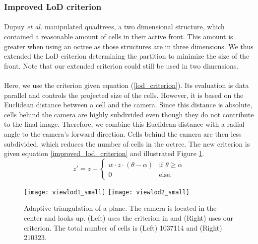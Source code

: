 \subsubsection*{Improved LoD criterion}

\paragraph{}
Dupuy \textit{et al.} manipulated quadtrees, a two dimensional structure, which contained a reasonable amount of cells in their active front.
This amount is greater when using an octree as those structures are in three dimensions.
We thus extended the LoD criterion determining the partition to minimize the size of the front.
Note that our extended criterion could still be used in two dimensions.

\paragraph{}
Here, we use the criterion given equation (\ref{lod_criterion}).
Its evaluation is data parallel and controls the projected size of the cells.
However, it is based on the Euclidean distance between a cell and the camera. 
Since this distance is absolute, cells behind the camera are highly subdivided even though they do not contribute to the final image.
Therefore, we combine this Euclidean distance with a radial angle to the camera's forward direction.
Cells behind the camera are then less subdivided, which reduces the number of cells in the octree.
The new criterion is given equation \ref{improved_lod_criterion} and illustrated Figure \ref{fig_lod_octree}.
\\
\begin{equation}
z'= z +
\begin{cases}
    w \cdot z \cdot (\theta - \alpha) 	& \text{if } \theta \geq \alpha\\
    0	              		    			& \text{else.}
\end{cases}
\label{improved_lod_criterion}
\end{equation}

\begin{figure}
  	\texttt{[image: viewlod1\_small]}
  	\hfill
  	\texttt{[image: viewlod2\_small]}
  \caption{ Adaptive triangulation of a plane. The camera is located in the center and looks up. (Left) uses the criterion in \cite{dupuy2014quadtrees} and (Right) uses our criterion.
  The total number of cells is (Left) 1037114 and (Right) 210323.}
  \label{fig_lod_octree} 
\end{figure}

